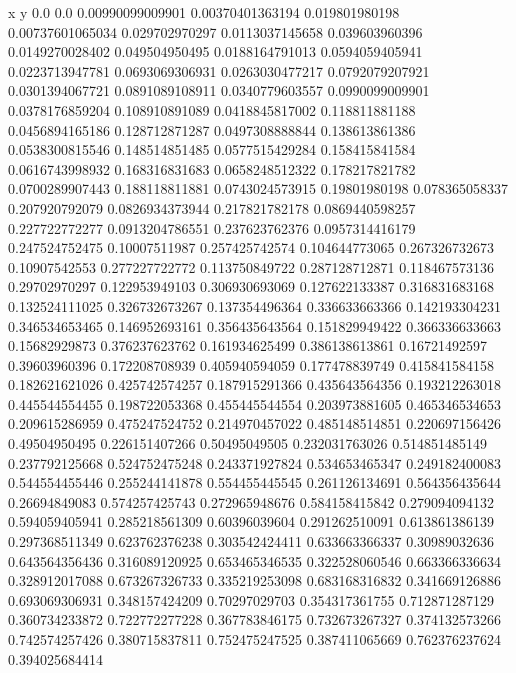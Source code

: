               x                y
            0.0              0.0
0.00990099009901  0.00370401363194
 0.019801980198  0.00737601065034
 0.029702970297  0.0113037145658
 0.039603960396  0.0149270028402
 0.049504950495  0.0188164791013
0.0594059405941  0.0223713947781
0.0693069306931  0.0263030477217
0.0792079207921  0.0301394067721
0.0891089108911  0.0340779603557
0.0990099009901  0.0378176859204
 0.108910891089  0.0418845817002
 0.118811881188  0.0456894165186
 0.128712871287  0.0497308888844
 0.138613861386  0.0538300815546
 0.148514851485  0.0577515429284
 0.158415841584  0.0616743998932
 0.168316831683  0.0658248512322
 0.178217821782  0.0700289907443
 0.188118811881  0.0743024573915
  0.19801980198   0.078365058337
 0.207920792079  0.0826934373944
 0.217821782178  0.0869440598257
 0.227722772277  0.0913204786551
 0.237623762376  0.0957314416179
 0.247524752475    0.10007511987
 0.257425742574   0.104644773065
 0.267326732673    0.10907542553
 0.277227722772   0.113750849722
 0.287128712871   0.118467573136
  0.29702970297   0.122953949103
 0.306930693069   0.127622133387
 0.316831683168   0.132524111025
 0.326732673267   0.137354496364
 0.336633663366   0.142193304231
 0.346534653465   0.146952693161
 0.356435643564   0.151829949422
 0.366336633663    0.15682929873
 0.376237623762   0.161934625499
 0.386138613861    0.16721492597
  0.39603960396   0.172208708939
 0.405940594059   0.177478839749
 0.415841584158   0.182621621026
 0.425742574257   0.187915291366
 0.435643564356   0.193212263018
 0.445544554455   0.198722053368
 0.455445544554   0.203973881605
 0.465346534653   0.209615286959
 0.475247524752   0.214970457022
 0.485148514851   0.220697156426
  0.49504950495   0.226151407266
  0.50495049505   0.232031763026
 0.514851485149   0.237792125668
 0.524752475248   0.243371927824
 0.534653465347   0.249182400083
 0.544554455446   0.255244141878
 0.554455445545   0.261126134691
 0.564356435644    0.26694849083
 0.574257425743   0.272965948676
 0.584158415842   0.279094094132
 0.594059405941   0.285218561309
  0.60396039604   0.291262510091
 0.613861386139   0.297368511349
 0.623762376238   0.303542424411
 0.633663366337    0.30989032636
 0.643564356436   0.316089120925
 0.653465346535   0.322528060546
 0.663366336634   0.328912017088
 0.673267326733   0.335219253098
 0.683168316832   0.341669126886
 0.693069306931   0.348157424209
  0.70297029703   0.354317361755
 0.712871287129   0.360734233872
 0.722772277228   0.367783846175
 0.732673267327   0.374132573266
 0.742574257426   0.380715837811
 0.752475247525   0.387411065669
 0.762376237624   0.394025684414
